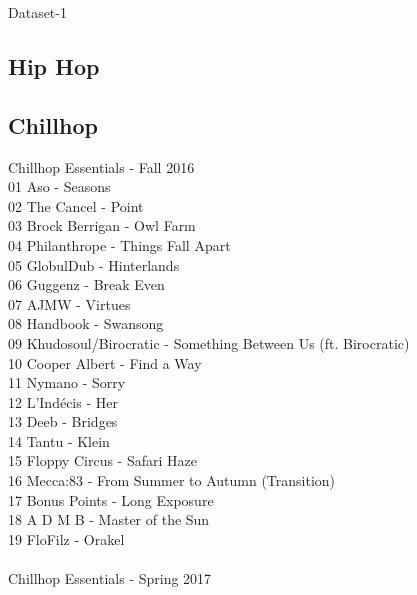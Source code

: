 \huge Dataset-1 \normalsize\\

\begin{multicols}{2}

\section*{Hip Hop}
\subsection*{Chillhop}
\large Chillhop Essentials - Fall 2016 \normalsize\\
 01 Aso - Seasons\\ 02 The Cancel - Point\\ 03 Brock Berrigan - Owl Farm\\ 04 Philanthrope - Things Fall Apart\\ 05 GlobulDub - Hinterlands\\ 06 Guggenz - Break Even\\ 07 AJMW - Virtues\\ 08 Handbook - Swansong\\ 09 Khudosoul/Birocratic - Something Between Us (ft. Birocratic)\\ 10 Cooper Albert - Find a Way\\ 11 Nymano - Sorry\\ 12 L'Indécis - Her\\ 13 Deeb - Bridges\\ 14 Tantu - Klein\\ 15 Floppy Circus - Safari Haze\\ 16 Mecca:83 - From Summer to Autumn (Transition)\\ 17 Bonus Points - Long Exposure\\ 18 A D M B - Master of the Sun\\ 19 FloFilz - Orakel\\
\\ \large Chillhop Essentials - Spring 2017 \normalsize\\

\end{multicols}
